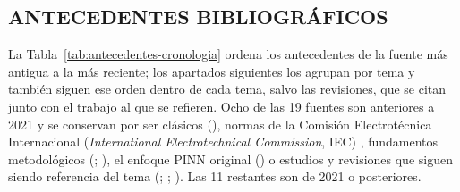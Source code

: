 \subsection{ANTECEDENTES BIBLIOGRÁFICOS}
\label{sec:antecedentes}

La Tabla~\ref{tab:antecedentes-cronologia} ordena los antecedentes de la fuente más antigua a la más reciente; los apartados siguientes los agrupan por tema y también siguen ese orden dentro de cada tema, salvo las revisiones, que se citan junto con el trabajo al que se refieren. Ocho de las 19 fuentes son anteriores a 2021 y se conservan por ser clásicos (\textcite{neher1957}), normas de la Comisión Electrotécnica Internacional (\textit{International Electrotechnical Commission}, IEC) \parencite{iec60853}, fundamentos metodológicos (\textcite{peffers2007}; \textcite{gregor2013}), el enfoque PINN original (\textcite{raissi2019}) o estudios y revisiones que siguen siendo referencia del tema (\textcite{aras2005}; \textcite{oclon2015}; \textcite{enescu2020}). Las 11 restantes son de 2021 o posteriores.

